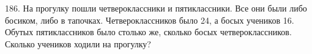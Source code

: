 186. На прогулку пошли четвероклассники и пятиклассники. Все они были либо босиком, либо в тапочках. Четвероклассников было 24, а босых учеников 16. Обутых пятиклассников было столько же, сколько босых четвероклассников. Сколько учеников  ходили на прогулку?\\
